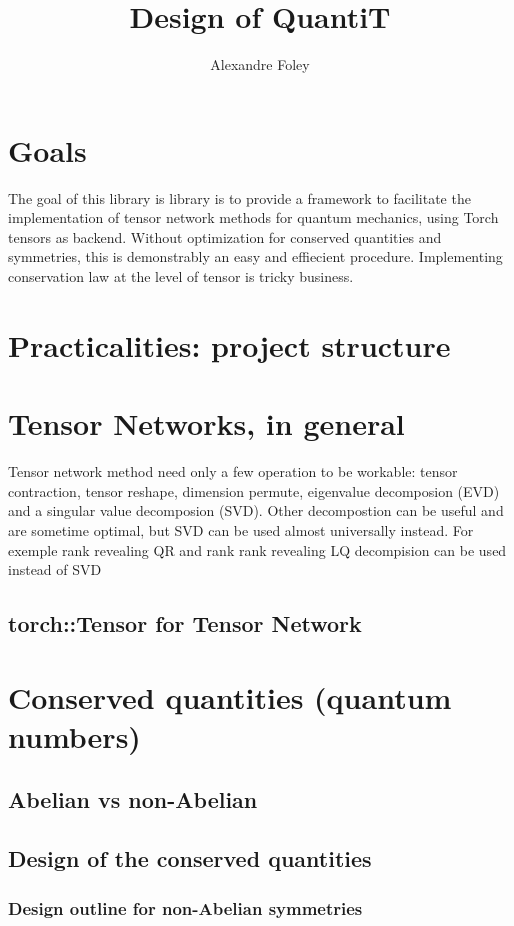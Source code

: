 \documentclass[15pt]{book}
\begin{document}
\title{Design of QuantiT}
\author{Alexandre Foley}

\maketitle

\tableofcontents
\chapter*{Goals}
The goal of this library is library is to provide a framework to facilitate the implementation of tensor network methods for quantum mechanics, using Torch tensors as backend.
Without optimization for conserved quantities and symmetries, this is demonstrably an easy and effiecient procedure.
Implementing conservation law at the level of tensor is tricky business.

\chapter{Practicalities: project structure}

\chapter{Tensor Networks, in general}
Tensor network method need only a few operation to be workable: tensor contraction, tensor reshape, dimension permute, eigenvalue decomposion (EVD) and a singular value decomposion (SVD).
Other decompostion can be useful and are sometime optimal, but SVD can be used almost universally instead. For exemple rank revealing QR and rank rank revealing LQ decompision can be used instead of SVD
\section{torch::Tensor for Tensor Network}


\chapter{Conserved quantities (quantum numbers)}
\section{Abelian vs non-Abelian}
\section{Design of the conserved quantities}
\subsection{Design outline for non-Abelian symmetries}
\end{document}
